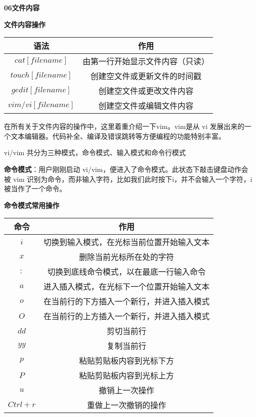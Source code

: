 \textbf{06文件内容}

\begin{center}
\textbf{文件内容操作}

	\begin{tabular}{cc}
		\toprule[1.5pt]
		语法 & 作用\\
		\midrule[1pt]
		$  cat [file name]    $		&由第一行开始显示文件内容（只读）\\
		$  touch [file name]    $		&创建空文件或更新文件的时间戳\\
		$  gedit [file name]    $		&创建空文件或更改文件内容\\
		$  vim/vi [file name]    $		&创建空文件或编辑文件内容\\
		\bottomrule[1.5pt]
	\end{tabular}
\end{center}

在所有关于文件内容的操作中，这里着重介绍一下vim。vim是从 vi 发展出来的一个文本编辑器。代码补全、编译及错误跳转等方便编程的功能特别丰富。

vi/vim 共分为三种模式，命令模式、输入模式和命令行模式

\textbf{命令模式}：用户刚刚启动 vi/vim，便进入了命令模式。此状态下敲击键盘动作会被 vim 识别为命令，而非输入字符，比如我们此时按下i，并不会输入一个字符，i被当作了一个命令。

\begin{center}
\textbf{命令模式常用操作}

	\begin{tabular}{cc}
		\toprule[1.5pt]
		命令 & 作用\\
		\midrule[1pt]
		$  i    $		&切换到输入模式，在光标当前位置开始输入文本\\
		$  x    $		&删除当前光标所在处的字符\\
		$  :    $		&切换到底线命令模式，以在最底一行输入命令\\
		$  a    $		&进入插入模式，在光标下一个位置开始输入文本\\
		$  o    $		&在当前行的下方插入一个新行，并进入插入模式\\
		$  O    $		&在当前行的上方插入一个新行，并进入插入模式\\
		$  dd    $		&剪切当前行\\
		$  yy    $		&复制当前行\\
		$  p    $		&粘贴剪贴板内容到光标下方\\
		$  P    $		&粘贴剪贴板内容到光标上方\\
		$  u    $		&撤销上一次操作\\
		$  Ctrl + r    $		&重做上一次撤销的操作\\
		\bottomrule[1.5pt]
	\end{tabular}
\end{center}

